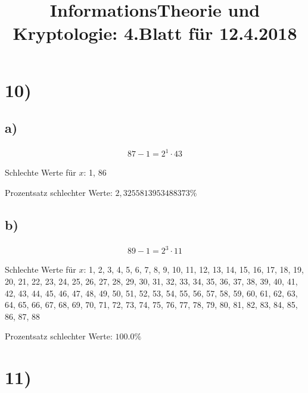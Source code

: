 \documentclass[11pt,a4paper]{article}
\author{}
\begin{document}
  \title{InformationsTheorie und Kryptologie: 4.Blatt für 12.4.2018}
  \maketitle

  \section*{10)}



  

  \subsection*{a)}

  \begin{align*}
    87 - 1 = 2^{1} \cdot 43
  \end{align*}

  Schlechte Werte für $x$: 1, 86

  Prozentsatz schlechter Werte: $2,3255813953488373 \% $

  \subsection*{b)}

  \begin{align*}
    89 - 1 = 2^{3} \cdot 11
  \end{align*}

  Schlechte Werte für $x$: 1, 2, 3, 4, 5, 6, 7, 8, 9, 10, 11, 12, 13, 14, 15, 16, 17, 18, 19, 20, 21, 22, 23, 24, 25, 26, 27, 28, 29, 30, 31, 32, 33, 34, 35, 36, 37, 38, 39, 40, 41, 42, 43, 44, 45, 46, 47, 48, 49, 50, 51, 52, 53, 54, 55, 56, 57, 58, 59, 60, 61, 62, 63, 64, 65, 66, 67, 68, 69, 70, 71, 72, 73, 74, 75, 76, 77, 78, 79, 80, 81, 82, 83, 84, 85, 86, 87, 88

  Prozentsatz schlechter Werte: $100.0 \%$


  \section*{11)}
\end{document}
